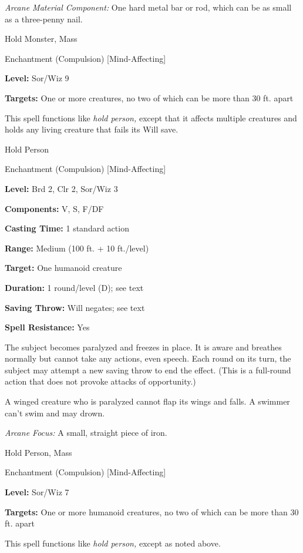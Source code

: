\documentclass{article}
\begin{document}
\textit{Arcane Material Component: }One hard metal bar or rod, which can be as 
small as a three-penny nail.

\vspace{12pt}
Hold Monster, Mass

Enchantment (Compulsion) [Mind-Affecting]

\textbf{Level:} Sor/Wiz 9

\textbf{Targets:} One or more creatures, no two of which can be more than 30 ft. 
apart

This spell functions like \textit{hold person, }except that it affects multiple 
creatures and holds any living creature that fails its Will save.

\vspace{12pt}
Hold Person

Enchantment (Compulsion) [Mind-Affecting]

\textbf{Level:} Brd 2, Clr 2, Sor/Wiz 3

\textbf{Components:} V, S, F/DF

\textbf{Casting Time:} 1 standard action

\textbf{Range: }Medium (100 ft. + 10 ft./level)

\textbf{Target:} One humanoid creature

\textbf{Duration:} 1 round/level (D); see text

\textbf{Saving Throw: }Will negates; see text

\textbf{Spell Resistance:} Yes

The subject becomes paralyzed and freezes in place. It is aware and breathes normally 
but cannot take any actions, even speech. Each round on its turn, the subject may 
attempt a new saving throw to end the effect. (This is a full-round action that 
does not provoke attacks of opportunity.)

A winged creature who is paralyzed cannot flap its wings and falls. A swimmer can't 
swim and may drown.

\textit{Arcane Focus: }A small, straight piece of iron.

\vspace{12pt}
Hold Person, Mass

Enchantment (Compulsion) [Mind-Affecting]

\textbf{Level:} Sor/Wiz 7

\textbf{Targets:} One or more humanoid creatures, no two of which can be more than 
30 ft. apart

This spell functions like \textit{hold person, }except as noted above.
\end{document}
